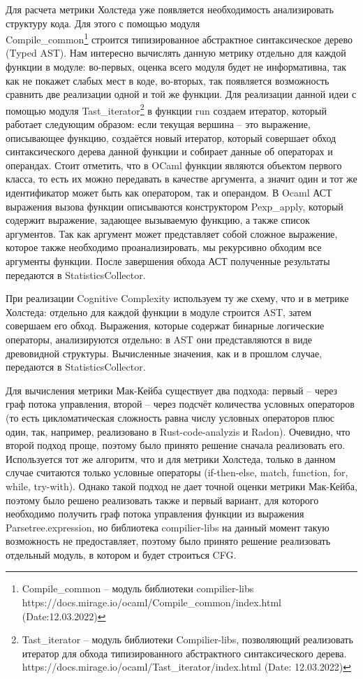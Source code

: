 Для расчета метрики Холстеда уже появляется необходимость
анализировать структуру кода. Для этого с помощью модуля \\ Compile\_common\footnote{Compile\_common -- модуль библиотеки compilier-libs\\  https://docs.mirage.io/ocaml/Compile\_common/index.html (Date:12.03.2022)} строится типизированное абстрактное синтаксическое дерево (Typed AST). Нам интересно вычислять данную метрику отдельно для каждой функции в модуле: во-первых, оценка всего модуля будет не информативна, так как не покажет слабых мест в коде, во-вторых, так появляется возможность сравнить две реализации
одной и той же функции. Для реализации данной идеи с помощью модуля Tast\_iterator\footnote{Tast\_iterator -- модуль библиотеки
Compilier-libs, позволяющий реализовать итератор для обхода типизированного абстрактного синтаксического дерева.\\https://docs.mirage.io/ocaml/Tast\_iterator/index.html (Date: 12.03.2022)} в функции run создаем
итератор, который работает следующим образом: если текущая вершина -- это выражение, описывающее функцию, создаётся 
новый итератор, который совершает обход синтаксического дерева данной функции и
собирает данные об операторах и операндах. Стоит отметить, что в OCaml функции являются
объектом первого класса, то есть их можно передавать в качестве аргумента, а значит 
один и тот же идентификатор может быть
как оператором, так и операндом. В Ocaml АСТ выражения вызова функции описываются конструктором Pexp\_apply, который содержит выражение, задающее вызываемую функцию,
а также список аргументов. Так как аргумент может представляет собой сложное выражение, которое 
также необходимо проанализировать, мы рекурсивно обходим все аргументы функции. После 
завершения обхода АСТ полученные результаты передаются в StatisticsCollector.

При реализации Cognitive Complexity используем ту же схему, что и в метрике
Холстеда: отдельно для каждой функции в модуле строится AST, затем совершаем
его обход. Выражения, которые содержат бинарные логические операторы, анализируются отдельно:
в AST они представляются в виде древовидной структуры. Вычисленные значения, как и в прошлом 
случае, передаются в StatisticsCollector.

Для вычисления метрики Мак-Кейба существует два подхода: первый -- через граф потока управления, второй -- через подсчёт количества условных операторов (то есть цикломатическая сложность равна числу условных операторов плюс один, так, например, реализовано в Rust-code-analyzis и Radon). Очевидно, что второй подход
проще, поэтому было принято решение сначала реализовать его.  
Используется тот же алгоритм, что и для метрики Холстеда, только в данном случае
считаются только условные операторы (if-then-else, match, function, for, while,
try-with). Однако такой подход не дает точной оценки метрики Мак-Кейба, поэтому  было решено
реализовать также и первый вариант, для которого необходимо получить граф потока управления функции из выражения Parsetree.expression, но библиотека compilier-libs на данный момент такую возможность не предоставляет, поэтому было принято решение
реализовать отдельный модуль, в котором и будет строиться CFG.

